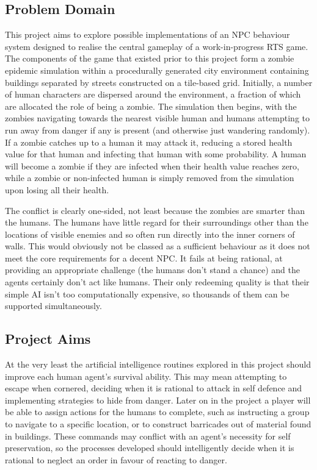 \documentclass[12pt,a4paper]{article}
\begin{document}
\subsection{Problem Domain}\noindent
This project aims to explore possible implementations of an NPC behaviour system designed to realise the central gameplay of a work-in-progress RTS game. The components of the game that existed prior to this project form a zombie epidemic simulation within a procedurally generated city environment containing buildings separated by streets constructed on a tile-based grid. Initially, a number of human characters are dispersed around the environment, a fraction of which are allocated the role of being a zombie. The simulation then begins, with the zombies navigating towards the nearest visible human and humans attempting to run away from danger if any is present (and otherwise just wandering randomly). If a zombie catches up to a human it may attack it, reducing a stored health value for that human and infecting that human with some probability. A human will become a zombie if they are infected when their health value reaches zero, while a zombie or non-infected human is simply removed from the simulation upon losing all their health.

The conflict is clearly one-sided, not least because the zombies are smarter than the humans. The humans have little regard for their surroundings other than the locations of visible enemies and so often run directly into the inner corners of walls. This would obviously not be classed as a sufficient behaviour as it does not meet the core requirements for a decent NPC. It fails at being rational, at providing an appropriate challenge (the humans don't stand a chance) and the agents certainly don't act like humans. Their only redeeming quality is that their simple AI isn't too computationally expensive, so thousands of them can be supported simultaneously.

\subsection{Project Aims}\noindent
At the very least the artificial intelligence routines explored in this project should improve each human agent's survival ability. This may mean attempting to escape when cornered, deciding when it is rational to attack in self defence and implementing strategies to hide from danger. Later on in the project a player will be able to assign actions for the humans to complete, such as instructing a group to navigate to a specific location, or to construct barricades out of material found in buildings. These commands may conflict with an agent's necessity for self preservation, so the processes developed should intelligently decide when it is rational to neglect an order in favour of reacting to danger.
\end{document}
